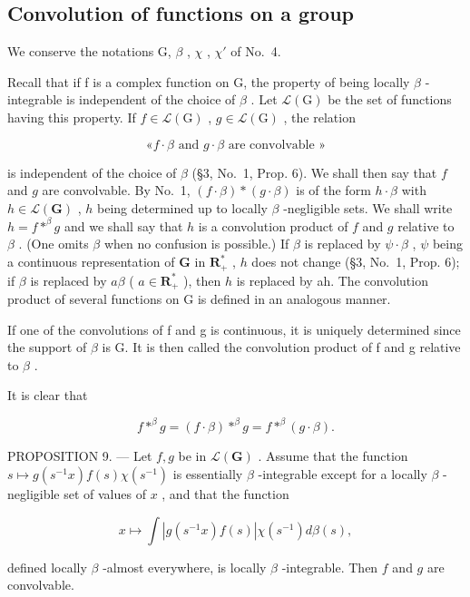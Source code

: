 \subsection{Convolution of functions on a group}

We conserve the notations G, \(\beta\) , \(\chi\) , \(\chi'\) of No.~4.

Recall that if f is a complex function on G, the property of being locally \(\beta\) -integrable is independent of the choice of \(\beta\) . Let \(\mathcal{L}(\mathrm{G})\) be the set of functions having this property. If \(f \in \mathcal{L}(\mathrm{G})\) , \(g \in \mathcal{L}(\mathrm{G})\) , the relation

\[\text{«}f \cdot \beta\text{ and }g \cdot \beta\text{ are convolvable »}\]

is independent of the choice of \(\beta\) (§3, No.~1, Prop. 6). We shall then say that \(f\) and \(g\) are convolvable. By No.~1, \((f\cdot \beta)*(g\cdot \beta)\) is of the form \(h\cdot \beta\) with \(h\in \mathcal{L}(\mathbf{G})\) , \(h\) being determined up to locally \(\beta\) -negligible sets. We shall write \(h = f * ^ {\beta} g\) and we shall say that \(h\) is a convolution product of \(f\) and \(g\) relative to \(\beta\) . (One omits \(\beta\) when no confusion is possible.) If \(\beta\) is replaced by \(\psi \cdot \beta\) , \(\psi\) being a continuous representation of \(\mathbf{G}\) in \(\mathbf{R}_+^*\) , \(h\) does not change (§3, No.~1, Prop. 6); if \(\beta\) is replaced by \(a\beta\) ( \(a\in \mathbf{R}_+^*\) ), then \(h\) is replaced by ah. The convolution product of several functions on G is defined in an analogous manner.

If one of the convolutions of f and g is continuous, it is uniquely determined since the support of \(\beta\) is G. It is then called the convolution product of f and g relative to \(\beta\) .

It is clear that

\[
f * ^ {\beta} g = (f \cdot \beta) * ^ {\beta} g = f * ^ {\beta} (g \cdot \beta).\tag{14}
\]

PROPOSITION 9. --- Let \(f,g\) be in \(\mathcal{L}(\mathbf{G})\) . Assume that the function \(s\mapsto g(s^{-1}x)f(s)\chi(s^{-1})\) is essentially \(\beta\) -integrable except for a locally \(\beta\) -negligible set of values of \(x\) , and that the function

\[
x \mapsto \int | g (s ^ {- 1} x) f (s) | \chi (s ^ {- 1}) d \beta (s),
\]

defined locally \(\beta\) -almost everywhere, is locally \(\beta\) -integrable. Then \(f\) and \(g\) are convolvable.

